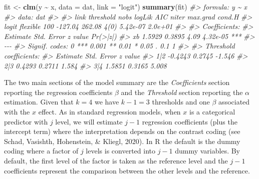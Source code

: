 \documentclass[
  man, mask,floatsintext]{apa6}
\newenvironment{Shaded}{\begin{snugshade}}{\end{snugshade}}
\newcommand{\AttributeTok}[1]{\textcolor[rgb]{0.13,0.29,0.53}{#1}}
\newcommand{\CommentTok}[1]{\textcolor[rgb]{0.56,0.35,0.01}{\textit{#1}}}
\newcommand{\FunctionTok}[1]{\textcolor[rgb]{0.13,0.29,0.53}{\textbf{#1}}}
\newcommand{\NormalTok}[1]{#1}
\newcommand{\OtherTok}[1]{\textcolor[rgb]{0.56,0.35,0.01}{#1}}
\newcommand{\SpecialCharTok}[1]{\textcolor[rgb]{0.81,0.36,0.00}{\textbf{#1}}}
\newcommand{\StringTok}[1]{\textcolor[rgb]{0.31,0.60,0.02}{#1}}
\begin{document}
\normalsize

\scriptsize

\normalsize

\scriptsize

\begin{Shaded}
\begin{Highlighting}[]
\NormalTok{fit }\OtherTok{\textless{}{-}} \FunctionTok{clm}\NormalTok{(y }\SpecialCharTok{\textasciitilde{}}\NormalTok{ x, }\AttributeTok{data =}\NormalTok{ dat, }\AttributeTok{link =} \StringTok{"logit"}\NormalTok{)}
\FunctionTok{summary}\NormalTok{(fit)}
\CommentTok{\#\textgreater{} formula: y \textasciitilde{} x}
\CommentTok{\#\textgreater{} data:    dat}
\CommentTok{\#\textgreater{} }
\CommentTok{\#\textgreater{}  link  threshold nobs logLik  AIC    niter max.grad cond.H }
\CommentTok{\#\textgreater{}  logit flexible  100  {-}127.04 262.08 4(0)  5.42e{-}07 2.0e+01}
\CommentTok{\#\textgreater{} }
\CommentTok{\#\textgreater{} Coefficients:}
\CommentTok{\#\textgreater{}    Estimate Std. Error z value Pr(\textgreater{}|z|)    }
\CommentTok{\#\textgreater{} xb   1.5929     0.3895    4.09 4.32e{-}05 ***}
\CommentTok{\#\textgreater{} {-}{-}{-}}
\CommentTok{\#\textgreater{} Signif. codes:  0 \textquotesingle{}***\textquotesingle{} 0.001 \textquotesingle{}**\textquotesingle{} 0.01 \textquotesingle{}*\textquotesingle{} 0.05 \textquotesingle{}.\textquotesingle{} 0.1 \textquotesingle{} \textquotesingle{} 1}
\CommentTok{\#\textgreater{} }
\CommentTok{\#\textgreater{} Threshold coefficients:}
\CommentTok{\#\textgreater{}     Estimate Std. Error z value}
\CommentTok{\#\textgreater{} 1|2  {-}0.4243     0.2745  {-}1.546}
\CommentTok{\#\textgreater{} 2|3   0.4293     0.2711   1.584}
\CommentTok{\#\textgreater{} 3|4   1.5851     0.3165   5.008}
\end{Highlighting}
\end{Shaded}

\normalsize

The two main sections of the model summary are the \emph{Coefficients} section reporting the regression coefficients \(\beta\) and the \emph{Threshold} section reporting the \(\alpha\) estimation. Given that \(k = 4\) we have \(k - 1 = 3\) thresholds and one \(\beta\) associated with the \(x\) effect. As in standard regression models, when \(x\) is a categorical predictor with \(j\) level, we will estimate \(j - 1\) regression coefficients (plus the intercept term) where the interpretation depends on the contrast coding (see Schad, Vasishth, Hohenstein, \& Kliegl, 2020). In R the default is the dummy coding where a factor of \(j\) levels is converted into \(j - 1\) dummy variables. By default, the first level of the factor is taken as the reference level and the \(j - 1\) coefficients represent the comparison between the other levels and the reference.
\end{document}

